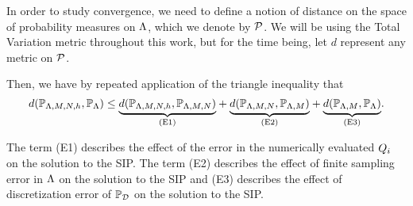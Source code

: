In order to study convergence, we need to define a notion of distance on the space of probability measures on ${\Lambda}$, which we denote by $\mathcal{P}$.
We will be using the Total Variation metric throughout this work, but for the time being, let $d$ represent any metric on $\mathcal{P}$.

Then, we have by repeated application of the triangle inequality that
\begin{equation}
\label{eq:set-triangleineq}
d(\mathbb{P}_{{\Lambda}, M, N, h}, \operatorname*{\mathbb{P}_{{\Lambda}}}) \leq
\underset{ \text{(E1)} }{\underbrace{d(\mathbb{P}_{{\Lambda}, M, N, h},\mathbb{P}_{{\Lambda}, M, N})}} +
\underset{ \text{(E2)} }{\underbrace{d(\mathbb{P}_{{\Lambda}, M, N}, \mathbb{P}_{{\Lambda}, M}) }}+
\underset{ \text{(E3)} }{\underbrace{d(\mathbb{P}_{{\Lambda}, M}, \operatorname*{\mathbb{P}_{{\Lambda}}}) }}.
\end{equation}

The term (E1) describes the effect of the error in the numerically evaluated $Q_i$ on the solution to the SIP.
The term (E2) describes the effect of finite sampling error in ${\Lambda}$ on the solution to the SIP and (E3) describes the effect of discretization error of $\operatorname*{\mathbb{P}_{\mathcal{D}}}$ on the solution to the SIP.
